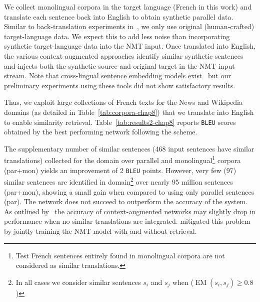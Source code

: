 We collect monolingual corpora in the target language (French in this work) and translate each sentence back into English to obtain synthetic parallel data. Similar to back-translation experiments in~\citet{Sennrich16improving}, we only use original (human-crafted) target-language data. We expect this to add less noise than incorporating synthetic target-language data into the NMT input.
Once translated into English, the various context-augmented approaches identify similar synthetic sentences and injects both the synthetic source and original target in the NMT input stream.
%
Note that cross-lingual sentence embedding models exist~\citep{schwenk17learning,sabet2019robust,Conneau19crosslingual} but our preliminary experiments using these tools did not show satisfactory results.

Thus, we exploit large collections of French texts for the News and Wikipedia domains (as detailed in Table~\ref{tab:corpora-chap8}) that we translate into English to enable similarity retrieval. 
%
Table~\ref{tab:results2-chap8} reports \texttt{BLEU} scores obtained by the best performing network  following the  scheme.

The supplementary number of similar sentences (468 input sentences have similar translations) collected for the  domain over parallel and monolingual\footnote{Test French sentences entirely found in monolingual  corpora are not considered as similar translations.} corpora (par+mon) yields an improvement of 2 \texttt{BLEU} points.
However, very few (97) similar sentences are identified in  domain\footnote{In all cases we consider similar sentences $s_i$ and $s_j$ when ($\operatorname{EM}(s_i,s_j) \ge 0.8$)} over nearly 95 million sentences (par+mon), showing a small gain when compared to using only parallel sentences (par). The network does not succeed to outperform the accuracy of the  system. 
As outlined by~\citet{bulte19neural,xu20boosting} the accuracy of context-augmented networks may slightly drop in performance when no similar translations are integrated. \citet{he21fast} mitigated this problem by jointly training the NMT model with and without retrieval.

